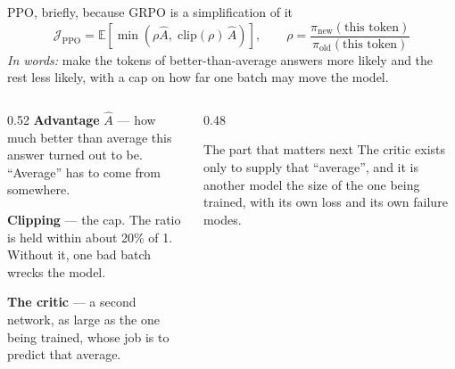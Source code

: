 \documentclass[aspectratio=169,10pt]{beamer}
\begin{document}
\begin{frame}{PPO, briefly, because GRPO is a simplification of it}
  \[
    \mathcal{J}_{\mathrm{PPO}} = \mathbb{E}\!\left[
      \min\!\left(\rho \hat{A},\;
      \mathrm{clip}(\rho)\,\hat{A}\right)\right],
    \qquad
    \rho = \frac{\pi_{\mathrm{new}}(\text{this token})}
                {\pi_{\mathrm{old}}(\text{this token})}
  \]
  \emph{In words:} make the tokens of better-than-average answers more likely
  and the rest less likely, with a cap on how far one batch may move the model.
  \vspace{0.3em}

  \begin{columns}[T]
    \begin{column}{0.52\textwidth}
      \small
      \textbf{Advantage} $\hat{A}$ --- how much better than average this answer
      turned out to be. ``Average'' has to come from somewhere.
      \vspace{0.4em}

      \textbf{Clipping} --- the cap. The ratio is held within about 20\% of 1.
      Without it, one bad batch wrecks the model.
      \vspace{0.4em}

      \textbf{The critic} --- a second network, as large as the one being
      trained, whose job is to predict that average.
    \end{column}
    \begin{column}{0.48\textwidth}
      \begin{block}{The part that matters next}
        \small
        The critic exists only to supply that ``average'', and it is another
        model the size of the one being trained, with its own loss and its own
        failure modes.
        \vspace{0.4em}

      \end{block}
    \end{column}
  \end{columns}
\end{frame}
\end{document}
